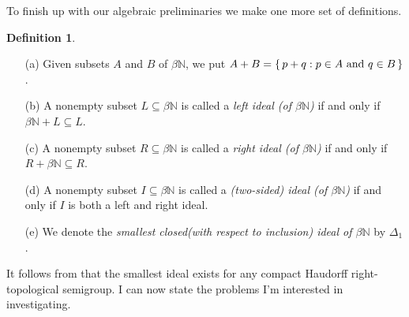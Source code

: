 \documentclass[12pt]{article}
\theoremstyle{plain}
\theoremstyle{definition}
\newtheorem{defn}[thm]{Definition}
\newcommand{\bbN}{\mathbb{N}}
\begin{document}
To finish up with our algebraic preliminaries we make one more
set of definitions.
  \begin{defn}
    \begin{itemize}
      \item[(a)] Given subsets $A$ and $B$ of $\beta\bbN$, we put $A +
        B = \{\, p+q : \hbox{$p \in A$ and $q \in B$} \,\}$.
      \item[(b)] A nonempty subset $L \subseteq \beta\bbN$ is called a
        \textsl{left ideal (of $\beta\bbN$)} if and only if $\beta\bbN
        + L \subseteq L$.
      \item[(c)] A nonempty subset $R \subseteq \beta\bbN$ is called a
        \textsl{right ideal (of $\beta\bbN$)} if and only if $R +
        \beta\bbN \subseteq R$.
      \item[(d)] A nonempty subset $I \subseteq \beta\bbN$ is called a
        \textsl{(two-sided) ideal (of $\beta\bbN$)} if and only if $I$
        is both a left and right ideal.
      \item[(e)] We denote the \textsl{smallest closed(with respect to
          inclusion) ideal of $\beta\bbN$} by $\Delta_1$.
    \end{itemize}
  \end{defn}
It follows from \cite[Theorem 2.8]{Hindman:1998fk} that the smallest ideal
exists for any compact Haudorff right-topological semigroup. 
I can now state the problems I'm interested in investigating.
\end{document}
